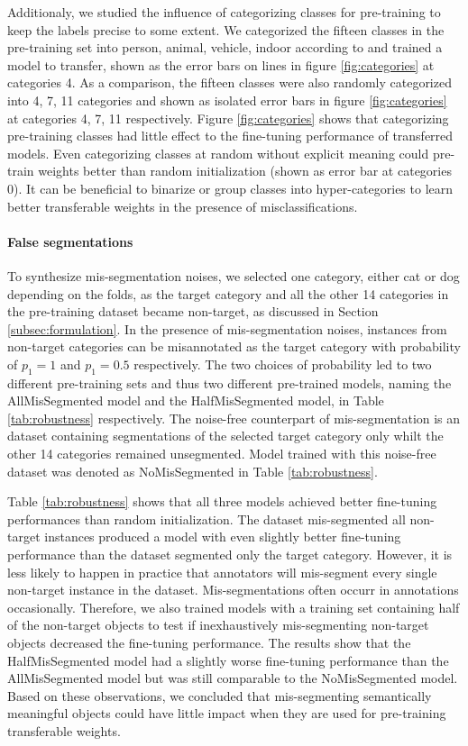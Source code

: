 Additionaly, we studied the influence of categorizing classes for pre-training to keep the labels precise to some extent.
We categorized the fifteen classes in the pre-training set into person, animal, vehicle, indoor according to \cite{everingham2015pascal} and trained a model to transfer, shown as the error bars on lines in figure \ref{fig:categories} at categories 4.
As a comparison, the fifteen classes were also randomly categorized into 4, 7, 11 categories and shown as isolated error bars in figure \ref{fig:categories} at categories 4, 7, 11 respectively.
Figure \ref{fig:categories} shows that categorizing pre-training classes had little effect to the fine-tuning performance of transferred models.
Even categorizing classes at random without explicit meaning could pre-train weights better than random initialization (shown as error bar at categories 0).
It can be beneficial to binarize or group classes into hyper-categories to learn better transferable weights in the presence of misclassifications.

\paragraph{False segmentations}
To synthesize mis-segmentation noises, we selected one category, either cat or dog depending on the folds, as the target category and all the other 14 categories in the pre-training dataset became non-target, as discussed in Section \ref{subsec:formulation}.
In the presence of mis-segmentation noises, instances from non-target categories can be misannotated as the target category with probability of $p_{1} = 1$ and $p_{1}= 0.5$ respectively.
The two choices of probability led to two different pre-training sets and thus two different pre-trained models, naming the AllMisSegmented model and the HalfMisSegmented model, in Table \ref{tab:robustness} respectively.
The noise-free counterpart of mis-segmentation is an dataset containing segmentations of the selected target category only whilt the other 14 categories remained unsegmented.
Model trained with this noise-free dataset was denoted as NoMisSegmented in Table \ref{tab:robustness}.

\noindent
Table \ref{tab:robustness} shows that all three models achieved better fine-tuning performances than random initialization.
The dataset mis-segmented all non-target instances produced a model with even slightly better fine-tuning performance than the dataset segmented only the target category.
However, it is less likely to happen in practice that annotators will mis-segment every single non-target instance in the dataset.
Mis-segmentations often occurr in annotations occasionally.
Therefore, we also trained models with a training set containing half of the non-target objects to test if inexhaustively mis-segmenting non-target objects decreased the fine-tuning performance.
The results show that the HalfMisSegmented model had a slightly worse fine-tuning performance than the AllMisSegmented model but was still comparable to the NoMisSegmented model.
Based on these observations, we concluded that mis-segmenting semantically meaningful objects could have little impact when they are used for pre-training transferable weights.



